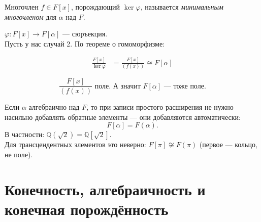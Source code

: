 \begin{definition}
    Многочлен $f \in F[x]$, порождающий $\ker\varphi$, называется \emph{минимальным многочленом}
    для $\alpha$ над $F$.
\end{definition}

\begin{remark}
    $\varphi \colon F[x] \to F[\alpha]$ --- сюръекция. \\
    Пусть у нас случай 2. По теореме о гомоморфизме:

    \begin{align*}
        \frac{F[x]}{\ker \varphi} &= \frac{F[x]}{(f(x))} \cong F[\alpha]
    \end{align*}

    \[
    \frac{F[x]}{(f(x))} \text{ поле. А значит $F[\alpha]$ --- тоже поле.}
    \]
    \begin{cor}
        Если $\alpha$ алгебраично над $F$, то при записи простого расширения не нужно насильно
        добавлять обратные элементы --- они добавляются автоматически:
        \[
            F[\alpha] = F(\alpha).
        \]
        В частности: $\mathbb{Q}(\sqrt{2}) = \mathbb{Q}[\sqrt{2}]$. \\
        Для трансцендентных элементов это неверно: $F[\pi] \not\cong F(\pi)$ (первое --- кольцо, не поле).
    \end{cor}
\end{remark}







\section{Конечность, алгебраичность и конечная порождённость}

